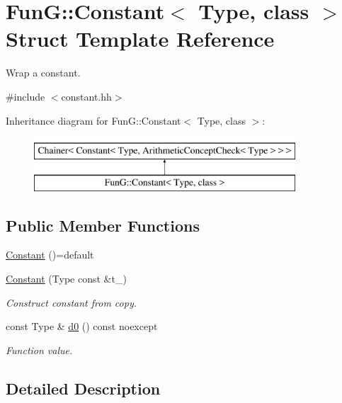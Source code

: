 \hypertarget{structFunG_1_1Constant}{}\section{FunG\+:\+:Constant$<$ Type, class $>$ Struct Template Reference}
\label{structFunG_1_1Constant}


Wrap a constant.  




{\ttfamily \#include $<$constant.\+hh$>$}

Inheritance diagram for FunG\+:\+:Constant$<$ Type, class $>$\+:\begin{figure}[H]
\begin{center}
\leavevmode
\includegraphics[height=2.000000cm]{structFunG_1_1Constant}
\end{center}
\end{figure}
\subsection*{Public Member Functions}
\begin{DoxyCompactItemize}
\item 
\hyperlink{structFunG_1_1Constant_a29ead8431e2fadfef397aae5dc5a4511}{Constant} ()=default
\item 
\hyperlink{structFunG_1_1Constant_a310783597f488e554de12627bf56aec8}{Constant} (Type const \&t\+\_\+)
\begin{DoxyCompactList}\small\item\em Construct constant from copy. \end{DoxyCompactList}\item 
const Type \& \hyperlink{structFunG_1_1Constant_aad514a9470fbe1c47c0f07da6e160416}{d0} () const noexcept
\begin{DoxyCompactList}\small\item\em Function value. \end{DoxyCompactList}\end{DoxyCompactItemize}


\subsection{Detailed Description}
